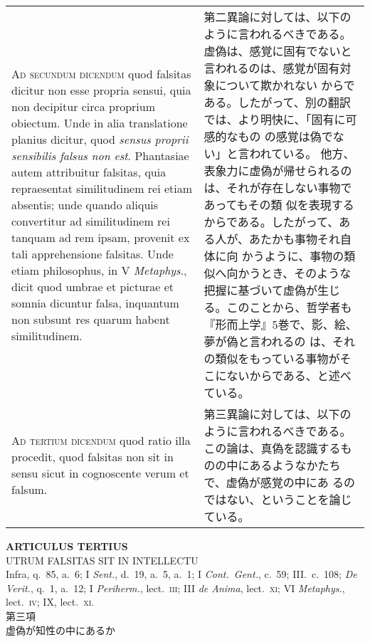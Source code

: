 \documentclass[paper=a4paper,fontsize=10pt,jafontsize=9pt,titlepage]{jlreq}
\begin{document}
\begin{longtable}{p{21em}p{21em}}
\\


{\scshape Ad secundum dicendum} quod falsitas dicitur non esse propria
sensui, quia non decipitur circa proprium obiectum. Unde in alia
translatione planius dicitur, quod {\itshape sensus proprii sensibilis falsus non
est}. Phantasiae autem attribuitur falsitas, quia repraesentat
similitudinem rei etiam absentis; unde quando aliquis convertitur ad
similitudinem rei tanquam ad rem ipsam, provenit ex tali apprehensione
falsitas. Unde etiam philosophus, in V {\itshape Metaphys}., dicit quod umbrae et
picturae et somnia dicuntur falsa, inquantum non subsunt res quarum
habent similitudinem.


&

第二異論に対しては、以下のように言われるべきである。
虚偽は、感覚に固有でないと言われるのは、感覚が固有対象について欺かれない
 からである。したがって、別の翻訳では、より明快に、「固有に可感的なもの
 の感覚は偽でない」と言われている。
他方、表象力に虚偽が帰せられるのは、それが存在しない事物であってもその類
 似を表現するからである。したがって、ある人が、あたかも事物それ自体に向
 かうように、事物の類似へ向かうとき、そのような把握に基づいて虚偽が生じ
 る。このことから、哲学者も『形而上学』5巻で、影、絵、夢が偽と言われるの
 は、それの類似をもっている事物がそこにないからである、と述べている。

\\


{\scshape Ad tertium dicendum} quod ratio illa procedit, quod falsitas
non sit in sensu sicut in cognoscente verum et falsum.


&

第三異論に対しては、以下のように言われるべきである。
この論は、真偽を認識するものの中にあるようなかたちで、虚偽が感覚の中にあ
 るのではない、ということを論じている。




\end{longtable}
\newpage



\begin{center}
 {\Large {\bfseries ARTICULUS TERTIUS}}\\
 {\large UTRUM FALSITAS SIT IN INTELLECTU}\\
 {\footnotesize Infra, q.~85, a.~6; I {\itshape Sent.}, d.~19, a.~5,
 a.~1; I {\itshape Cont.~Gent.}, c.~59; III.~c.~108; {\itshape De
 Verit.}, q.~1, a.~12; I {\itshape Periherm.}, lect.~{\scshape iii}; III
 {\itshape de Anima}, lect.~{\scshape xi}; VI {\itshape Metaphys.},
 lect.~{\scshape iv}; IX, lect.~{\scshape xi}.}\\
 {\Large 第三項\\虚偽が知性の中にあるか}
\end{center}
\end{document}

